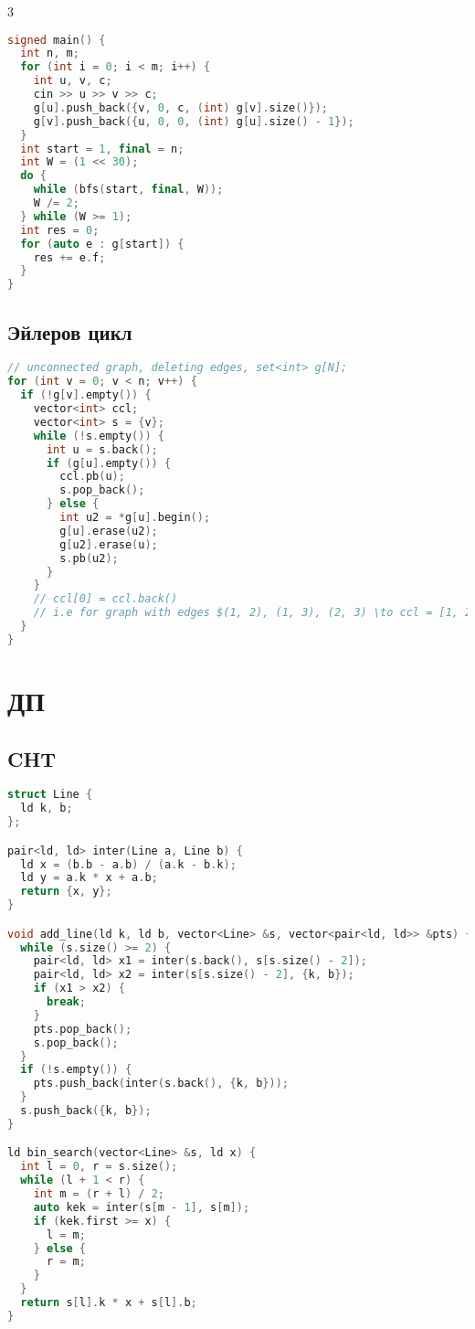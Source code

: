 \documentclass[10pt,a4paper,landscape,twosided]{extarticle}
\begin{document}
\begin{multicols*}{3}
\begin{lstlisting}[language=C++]
signed main() {
  int n, m;
  for (int i = 0; i < m; i++) {
    int u, v, c;
    cin >> u >> v >> c;
    g[u].push_back({v, 0, c, (int) g[v].size()});
    g[v].push_back({u, 0, 0, (int) g[u].size() - 1});
  }
  int start = 1, final = n;
  int W = (1 << 30);
  do {
    while (bfs(start, final, W));
    W /= 2;
  } while (W >= 1);
  int res = 0;
  for (auto e : g[start]) {
    res += e.f;
  }
}
\end{lstlisting}

\subsection{Эйлеров цикл}
\begin{lstlisting}[language=C++]
// unconnected graph, deleting edges, set<int> g[N];
for (int v = 0; v < n; v++) {
  if (!g[v].empty()) {
    vector<int> ccl;
    vector<int> s = {v};
    while (!s.empty()) {
      int u = s.back();
      if (g[u].empty()) {
        ccl.pb(u);
        s.pop_back();
      } else {
        int u2 = *g[u].begin();
        g[u].erase(u2);
        g[u2].erase(u);
        s.pb(u2);
      }
    }
    // ccl[0] = ccl.back()
    // i.e for graph with edges $(1, 2), (1, 3), (2, 3) \to ccl = [1, 2, 3, 1]$
  }
}
\end{lstlisting}

\section{ДП}

\subsection{CHT}
\begin{lstlisting}[language=C++]
struct Line {
  ld k, b;
};

pair<ld, ld> inter(Line a, Line b) {
  ld x = (b.b - a.b) / (a.k - b.k);
  ld y = a.k * x + a.b;
  return {x, y};
}

void add_line(ld k, ld b, vector<Line> &s, vector<pair<ld, ld>> &pts) {
  while (s.size() >= 2) {
    pair<ld, ld> x1 = inter(s.back(), s[s.size() - 2]);
    pair<ld, ld> x2 = inter(s[s.size() - 2], {k, b});
    if (x1 > x2) {
      break;
    }
    pts.pop_back();
    s.pop_back();
  }
  if (!s.empty()) {
    pts.push_back(inter(s.back(), {k, b}));
  }
  s.push_back({k, b});
}

ld bin_search(vector<Line> &s, ld x) {
  int l = 0, r = s.size();
  while (l + 1 < r) {
    int m = (r + l) / 2;
    auto kek = inter(s[m - 1], s[m]);
    if (kek.first >= x) {
      l = m;
    } else {
      r = m;
    }
  }
  return s[l].k * x + s[l].b;
}
\end{lstlisting}


\end{multicols*}
\end{document}
